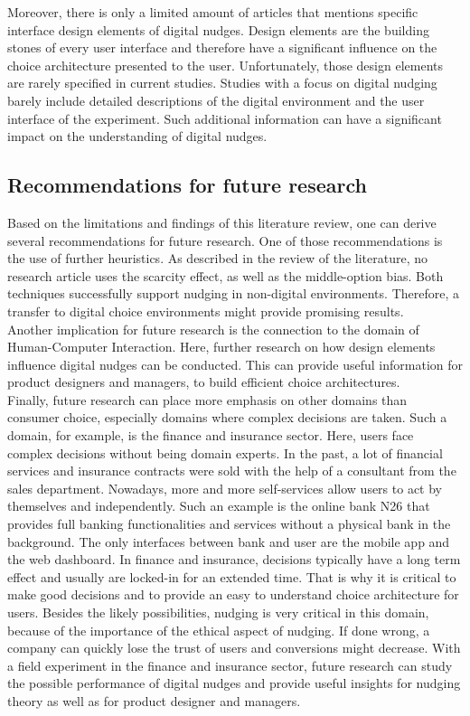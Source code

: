 Moreover, there is only a limited amount of articles that mentions specific interface design elements of digital nudges. Design elements are the building stones of every user interface and therefore have a significant influence on the choice architecture presented to the user. Unfortunately, those design elements are rarely specified in current studies. Studies with a focus on digital nudging barely include detailed descriptions of the digital environment and the user interface of the experiment. Such additional information can have a significant impact on the understanding of digital nudges.
\\
 
\subsection{Recommendations for future research}
Based on the limitations and findings of this literature review, one can derive several recommendations for future research. One of those recommendations is the use of further heuristics. As described in the review of the literature, no research article uses the scarcity effect, as well as the middle-option bias. Both techniques successfully support nudging in non-digital environments. Therefore, a transfer to digital choice environments might provide promising results.
\\
 
Another implication for future research is the connection to the domain of Human-Computer Interaction. Here, further research on how design elements influence digital nudges can be conducted. This can provide useful information for product designers and managers, to build efficient choice architectures. 
 \\
 
Finally, future research can place more emphasis on other domains than consumer choice, especially domains where complex decisions are taken. Such a domain, for example, is the finance and insurance sector. Here, users face complex decisions without being domain experts. In the past, a lot of financial services and insurance contracts were sold with the help of a consultant from the sales department. Nowadays, more and more self-services allow users to act by themselves and independently. %
Such an example is the online bank N26 that provides full banking functionalities and services without a physical bank in the background. The only interfaces between bank and user are the mobile app and the web dashboard. In finance and insurance, decisions typically have a long term effect and usually are locked-in for an extended time. That is why it is critical to make good decisions and to provide an easy to understand choice architecture for users. Besides the likely possibilities, nudging is very critical in this domain, because of the importance of the ethical aspect of nudging. If done wrong, a company can quickly lose the trust of users and conversions might decrease. With a field experiment in the finance and insurance sector, future research can study the possible performance of digital nudges and provide useful insights for nudging theory as well as for product designer and managers.